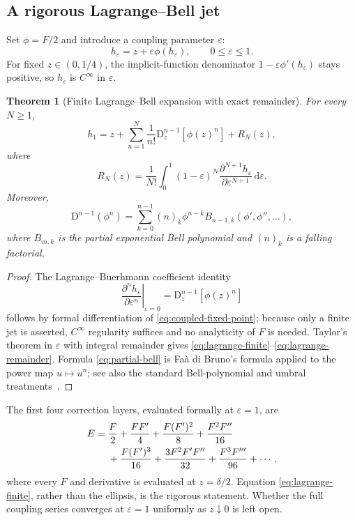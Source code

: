 \documentclass[11pt,oneside]{article}
\newtheorem{theorem}{Theorem}[section]
\theoremstyle{definition}
\theoremstyle{remark}
\newcommand{\dd}{\,\mathrm d}
\newcommand{\D}{\mathrm D}
\begin{document}
\subsection{A rigorous Lagrange--Bell jet}
Set $\phi=F/2$ and introduce a coupling parameter $\varepsilon$:
\begin{equation}
 h_\varepsilon=z+\varepsilon\phi(h_\varepsilon),
 \qquad 0\le\varepsilon\le1.
 \label{eq:coupled-fixed-point}
\end{equation}
For fixed $z\in(0,1/4)$, the implicit-function denominator
$1-\varepsilon\phi'(h_\varepsilon)$ stays positive, so $h_\varepsilon$ is $C^\infty$ in $\varepsilon$.

\begin{theorem}[Finite Lagrange--Bell expansion with exact remainder]
\label{thm:lagrange-bell}
For every $N\ge1$,
\begin{equation}
 h_1=z+\sum_{n=1}^{N}\frac1{n!}
 \D_z^{n-1}\!\left[\phi(z)^n\right]+R_N(z),
 \label{eq:lagrange-finite}
\end{equation}
where
\begin{equation}
 R_N(z)=\frac1{N!}\int_0^1(1-\varepsilon)^N
 \frac{\partial^{N+1}h_\varepsilon}{\partial\varepsilon^{N+1}}\dd\varepsilon.
 \label{eq:lagrange-remainder}
\end{equation}
Moreover,
\begin{equation}
 \D^{n-1}(\phi^n)
 =\sum_{k=0}^{n-1}(n)_k\phi^{n-k}
 B_{n-1,k}(\phi',\phi'',\ldots),
 \label{eq:partial-bell}
\end{equation}
where $B_{m,k}$ is the partial exponential Bell polynomial and $(n)_k$ is a falling factorial.
\end{theorem}

\begin{proof}
The Lagrange--Buerhmann coefficient identity
\[
 \left.\frac{\partial^n h_\varepsilon}{\partial\varepsilon^n}\right|_{\varepsilon=0}
 =\D_z^{n-1}[\phi(z)^n]
\]
follows by formal differentiation of \eqref{eq:coupled-fixed-point}; because only a finite jet is asserted, $C^\infty$ regularity suffices and no analyticity of $F$ is needed.  Taylor's theorem in $\varepsilon$ with integral remainder gives \eqref{eq:lagrange-finite}--\eqref{eq:lagrange-remainder}.  Formula \eqref{eq:partial-bell} is Fa\`a di Bruno's formula applied to the power map $u\mapsto u^n$; see also the standard Bell-polynomial and umbral treatments~\cite{comtet,roman}.
\end{proof}

The first four correction layers, evaluated formally at $\varepsilon=1$, are
\begin{align}
 E
={}&\frac F2+\frac{FF'}4
 +\frac{F(F')^2}{8}+\frac{F^2F''}{16}
 \notag\\
 &+\frac{F(F')^3}{16}
  +\frac{3F^2F'F''}{32}
  +\frac{F^3F'''}{96}+\cdots,
 \label{eq:inverse-bell-first}
\end{align}
where every $F$ and derivative is evaluated at $z=\delta/2$.  Equation \eqref{eq:lagrange-finite}, rather than the ellipsis, is the rigorous statement.  Whether the full coupling series converges at $\varepsilon=1$ uniformly as $z\downarrow0$ is left open.
\end{document}
